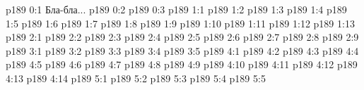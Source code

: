 \author{Промежуточные создания}
\vs p189 0:1  Бла-бла...
\vs p189 0:2 
\vs p189 0:3 
\vs p189 1:1 
\vs p189 1:2 
\vs p189 1:3 \pc 
\vs p189 1:4 
\vs p189 1:5 
\vs p189 1:6 
\vs p189 1:7 
\vs p189 1:8 
\vs p189 1:9 
\vs p189 1:10 \pc 
\vs p189 1:11 
\vs p189 1:12 
\vs p189 1:13 
\vs p189 2:1 
\vs p189 2:2 
\vs p189 2:3 
\vs p189 2:4 
\vs p189 2:5 
\vs p189 2:6 \pc 
\vs p189 2:7 
\vs p189 2:8 
\vs p189 2:9 
\vs p189 3:1 
\vs p189 3:2 
\vs p189 3:3 
\vs p189 3:4 \pc 
\vs p189 3:5 \pc 
{}
\vs p189 4:1 
\vs p189 4:2 \pc 
\vs p189 4:3 
\vs p189 4:4 
\vs p189 4:5 
\vs p189 4:6 
\vs p189 4:7 
\vs p189 4:8 
\vs p189 4:9 
\vs p189 4:10 \pc 
\vs p189 4:11 
\vs p189 4:12 \pc 
\vs p189 4:13 
\vs p189 4:14 
\vs p189 5:1 
\vs p189 5:2 
\vs p189 5:3 
\vs p189 5:4 
\vs p189 5:5 
\quizlink
